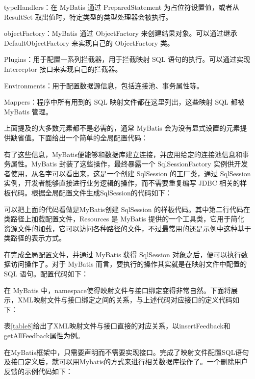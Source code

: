 typeHandlers：在 MyBatis 通过 PreparedStatement 为占位符设置值，或者从 ResultSet 取出值时，特定类型的类型处理器会被执行。

objectFactory：MyBatis 通过 ObjectFactory 来创建结果对象。可以通过继承 DefaultObjectFactory 来实现自己的 ObjectFactory 类。

Plugins：用于配置一系列拦截器，用于拦截映射 SQL 语句的执行。可以通过实现 Interceptor 接口来实现自己的拦截器。

Environments：用于配置数据源信息，包括连接池、事务属性等。

Mappers：程序中所有用到的 SQL 映射文件都在这里列出，这些映射 SQL 都被 MyBatis 管理。

上面提及的大多数元素都不是必需的，通常 MyBatis 会为没有显式设置的元素提供缺省值。下面给出一个简单的全局配置代码：



有了这些信息，MyBatis便能够和数据库建立连接，并应用给定的连接池信息和事务属性。MyBatis 封装了这些操作，最终暴露一个 SqlSessionFactory 实例供开发者使用，从名字可以看出来，这是一个创建 SqlSession 的工厂类，通过 SqlSession 实例，开发者能够直接进行业务逻辑的操作，而不需要重复编写 JDBC 相关的样板代码。根据全局配置文件生成SqlSession的代码如下：



可以把上面的代码看做是MyBatis创建 SqlSession 的样板代码。其中第二行代码在类路径上加载配置文件，Resources 是 MyBatis 提供的一个工具类，它用于简化资源文件的加载，它可以访问各种路径的文件，不过最常用的还是示例中这种基于类路径的表示方式。

在完成全局配置文件，并通过 MyBatis 获得 SqlSession 对象之后，便可以执行数据访问操作了。对于 MyBatis 而言，要执行的操作其实就是在映射文件中配置的 SQL 语句。配置代码如下：



在 MyBatis 中，namespace使得映射文件与接口绑定变得非常自然。下面将展示，XML映射文件与接口绑定之间的关系，与上述代码对应接口的定义代码如下：



表\ref{table8}给出了XML映射文件与接口直接的对应关系，以insertFeedback和getAll\-Feedback属性为例。


在MyBatis框架中，只需要声明而不需要实现接口。完成了映射文件配置SQL语句及接口定义后，就可以用Mybatis的方式来进行相关数据库操作了。一个删除用户反馈的示例代码如下：


